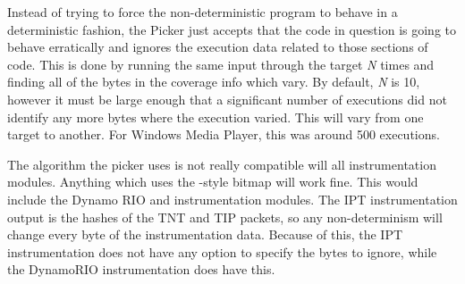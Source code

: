 Instead of trying to force the non-deterministic program to behave in a
deterministic fashion, the Picker just accepts that the code in question is
going to behave erratically and ignores the execution data related to those
sections of code.  This is done by running the same input through the target
\textit{N} times and finding all of the bytes in the coverage info which
vary. By default, \textit{N} is 10, however it must be large enough that a
significant number of executions did not identify any more bytes where the
execution varied. This will vary from one target to another.  For Windows
Media Player, this was around 500 executions.  %


The algorithm the picker uses is not really compatible will all instrumentation
modules. Anything which uses the \AFL{}-style bitmap will work fine.  This
would include the Dynamo RIO and \AFL{} instrumentation modules. The IPT
instrumentation output is the hashes of the TNT and TIP packets, so any
non-determinism will change every byte of the instrumentation data.  Because of
this, the IPT instrumentation does not have any option to specify the bytes to
ignore, while the DynamoRIO instrumentation does have this.
